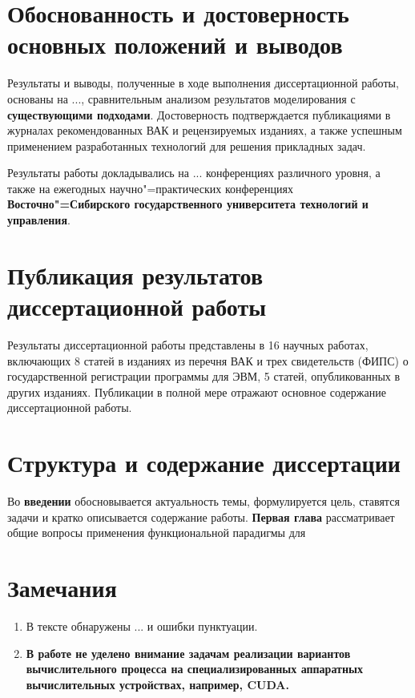 \documentclass[14pt]{extarticle}
\begin{document}
\section{Обоснованность и достоверность основных положений и выводов}
\label{sec:verification}

Результаты и выводы, полученные в ходе выполнения диссертационной работы, основаны на ..., сравнительным анализом результатов моделирования с \textbf{существующими подходами}.  Достоверность подтверждается публикациями в журналах рекомендованных ВАК и рецензируемых изданиях, а также успешным применением разработанных технологий для решения прикладных задач.

Результаты работы докладывались на ... конференциях различного уровня, а также на ежегодных научно"=практических конференциях \textbf{Восточно"=Сибирского государственного университета технологий и управления}.

\section{Публикация результатов диссертационной работы}
\label{sec:publ}

Результаты диссертационной работы представлены в 16 научных работах, включающих 8 статей в изданиях из перечня ВАК и трех свидетельств (ФИПС) о государственной регистрации программы для ЭВМ, 5 статей, опубликованных в других изданиях.  Публикации в полной мере отражают основное содержание диссертационной работы.

\section{Структура и содержание диссертации}

Во \textbf{введении} обосновывается актуальность темы, формулируется цель, ставятся задачи и кратко описывается содержание работы. \textbf{Первая глава} рассматривает общие вопросы применения функциональной парадигмы для
\section{Замечания}
\begin{enumerate}
\item В тексте обнаружены ... и ошибки пунктуации.
\item \textbf{В работе не уделено внимание задачам реализации вариантов вычислительного процесса на специализированных аппаратных вычислительных устройствах, например, CUDA.}

\end{enumerate}
\end{document}
